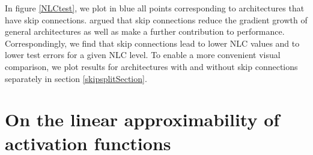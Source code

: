 \documentclass{article} %
\begin{document}
In figure \ref{NLCtest}, we plot in blue all points corresponding to architectures that have skip connections. \citet{expl} argued that skip connections reduce the gradient growth of general architectures as well as make a further contribution to performance. Correspondingly, we find that skip connections lead to lower NLC values and to lower test errors for a given NLC level. To enable a more convenient visual comparison, we plot results for architectures with and without skip connections separately in section \ref{skipsplitSection}.



\section{On the linear approximability of activation functions} \label{meaningSection}

\end{document}
